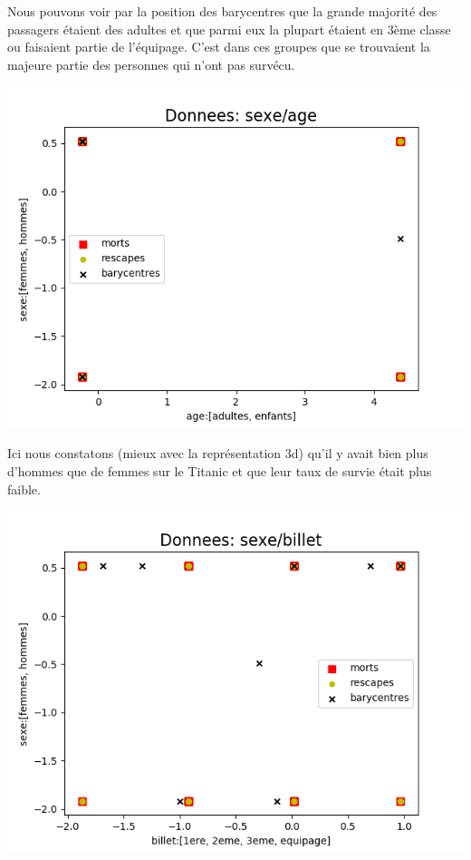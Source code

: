 \documentclass[a4paper,10pt]{article}
\begin{document}
        Nous pouvons voir par la position des barycentres que la grande majorité des passagers étaient des adultes et que parmi eux la plupart étaient en 3ème classe ou faisaient partie de l’équipage. C’est dans ces groupes que se trouvaient la majeure partie des personnes qui n’ont pas survécu.
        
        \begin{center}
            \includegraphics{p1-4}
        \end{center}
        
        Ici nous constatons (mieux avec la représentation 3d) qu’il y avait bien plus d’hommes que de femmes sur le Titanic et que leur taux de survie était plus faible.
        
        \begin{center}
            \includegraphics{p1-5}
        \end{center}
        
\end{document}
